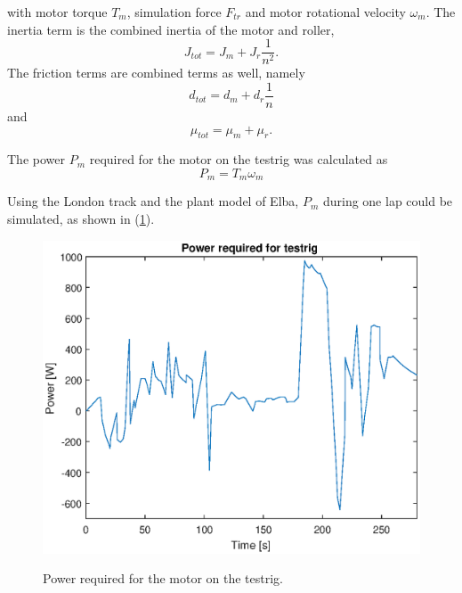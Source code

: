 
with motor torque $T_m$, simulation force $F_{tr}$ and motor rotational velocity
$\omega_m$. The inertia term is the combined inertia of the motor and
roller,
\begin{equation} \label{eq:totalinertia}
    J_{tot} = J_m + J_r \frac{1} {n^2}.
\end{equation}
The friction terms are combined terms as well, namely
\begin{equation} \label{eq:testrig_totalvfric}
    d_{tot} = d_m + d_r \frac {1} {n}
\end{equation}
and
\begin{equation} \label{eq:testrig_totalfric}
    \mu_{tot} = \mu_m + \mu_r.
\end{equation}

The power $P_m$ required for the motor on the testrig was calculated as
\begin{equation} \label{eq:testrig_motorpower}
	P_m = T_m \omega_m
\end{equation}

Using the London track and the plant model of Elba, $P_m$ during one lap could be simulated, as shown in (\ref{fig:testrig_power_required}).

\begin{figure}[H]
    \centering\label{fig:testrig_power_required}
    \includegraphics[width=\textwidth]{./img/testrig_power_required.eps}
    \caption{Power required for the motor on the testrig.}
\end{figure}

